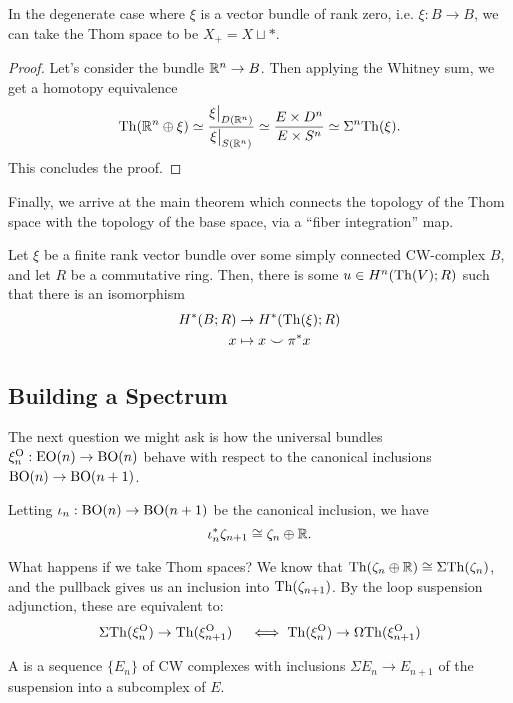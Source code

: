 \documentclass{article}
\begin{document}
\begin{remark}
  In the degenerate case where $\xi$ is a vector bundle of rank zero, i.e. $\xi : B \to B$, we can take the Thom space to be $X_+=X\sqcup *$.
\end{remark}

\begin{proof}
  Let's consider the bundle $\mathbb{R}^n \to B$. Then applying the Whitney sum, we get  a homotopy equivalence
  \[
    \Th(\R^n \oplus \xi) \simeq \frac{\restr{\xi}{D(\R^n)}}{\restr{\xi}{S(\R^n)}} \simeq\frac{E\times D^n}{E\times S^n} \simeq \Sigma^n\Th(\xi).
  \]
  This concludes the proof.
\end{proof}

Finally, we arrive at the main theorem which connects the topology of the Thom space with the topology of the base space, via a ``fiber integration'' map.

\begin{theorem}
  Let $\xi$ be a finite rank vector bundle over some simply connected CW-complex $B$, and let $R$ be a commutative ring. Then, there is some  $u\in H^n(\mathrm{Th}(V); R)$ such that there is an isomorphism
  \[
    \begin{aligned}
      H^*(B; R) &\to  H^*(\mathrm{Th}(\xi); R)\\
      x&\mapsto x\smile \pi^* x
    \end{aligned}
  \]
\end{theorem}

\subsection{Building a Spectrum}

The next question we might ask is how the universal bundles $\xi^{\mathrm{O}}_n : \mathrm{EO}(n) \to \mathrm{BO}(n)$ behave with respect to the canonical inclusions $\mathrm{BO}(n)\to \mathrm{BO}(n+1)$.

\begin{proposition}
  Letting $\iota_n : \mathrm{BO}(n) \to \mathrm{BO}(n+1)$ be the canonical inclusion, we have
  \[\iota_n^* \zeta_{n+1} \cong \zeta_n\oplus \mathbb{R}.\]
\end{proposition}

What happens if we take Thom spaces? We know that $\mathrm{Th}(\zeta_n\oplus \mathbb{R}) \cong \Sigma \mathrm{Th}(\zeta_n)$, and the pullback gives us an inclusion into $\mathrm{Th}(\zeta_{n+1})$. By the loop suspension adjunction, these are equivalent to: 
\[
    \Sigma \mathrm{Th}(\xi_n^{\mathrm{O}}) \to \mathrm{Th}(\xi_{n+1}^{\mathrm{O}})\quad \iff \mathrm{Th}(\xi^{\mathrm{O}}_n) \to \Omega \mathrm{Th}(\xi_{n+1}^{\mathrm{O}})
\]
\begin{definition}
  A  is a sequence $\{E_n\}$ of CW complexes with inclusions $\Sigma E_n \to E_{n+1}$ of the suspension into a subcomplex of $E$.
\end{definition}
\end{document}
